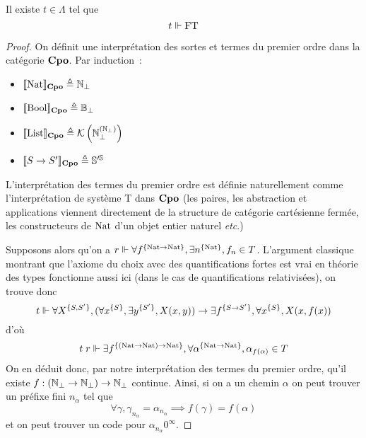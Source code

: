 \documentclass{article}
\begin{document}
\begin{them}[FAN]
  Il existe $t\in \Lambda$ tel que
  \[t\Vdash \mathrm{FT}\]
\end{them}

\begin{proof}
  On définit une interprétation des sortes et termes du premier ordre dans la catégorie $\mathbf{Cpo}$. Par induction~:
  \begin{itemize}
  \item $\llbracket \mathrm{Nat} \rrbracket_{\mathbf{Cpo}} \triangleq \mathbb{N}_\bot$
  \item $\llbracket \mathrm{Bool} \rrbracket_{\mathbf{Cpo}} \triangleq \mathbb{B}_\bot$
  \item $\llbracket \mathrm{List} \rrbracket_{\mathbf{Cpo}} \triangleq \mathcal K\left(\mathbb{N}_\bot^{(\mathbb{N}_\bot)}\right)$
  \item $\llbracket S \to S' \rrbracket_{\mathbf{Cpo}} \triangleq \mathbb{S}'^{\mathbb{S}}$
  \end{itemize}
  L'interprétation des termes du premier ordre est définie naturellement comme l'interprétation de système T dans $\mathbf{Cpo}$ (les paires, les abstraction et applications viennent directement de la structure de catégorie cartésienne fermée, les constructeurs de $\mathrm{Nat}$ d'un objet entier naturel \textit{etc}.)

  Supposons alors qu'on a $r\Vdash \forall f^{\{\mathrm{Nat} \to \mathrm{Nat}\}}, \exists n^{\{\mathrm{Nat}\}}, f_n \in T$. L'argument classique montrant que l'axiome du choix avec des quantifications fortes est vrai en théorie des types fonctionne aussi ici (dans le cas de quantifications relativisées), on trouve donc
  \[t\Vdash \forall X^{\{S,S'\}}, (\forall x^{\{S\}}, \exists y^{\{S'\}}, X(x,y))\to \exists f^{\{S \to S'\}}, \forall x^{\{S\}}, X(x,f(x))\]
  d'où
  \[t\;r\Vdash \exists f^{\{(\mathrm{Nat}\to\mathrm{Nat})\to\mathrm{Nat}\}}, \forall \alpha^{\{\mathrm{Nat}\to\mathrm{Nat}\}}, \alpha_{f(\alpha)}\in T\]
  On en déduit donc, par notre interprétation des termes du premier ordre, qu'il existe $f : (\mathbb{N}_\bot\to\mathbb{N}_\bot)\to\mathbb{N}_\bot$ continue. Ainsi, si on a un chemin $\alpha$ on peut trouver un préfixe fini $n_\alpha$ tel que
  \[\forall \gamma, \gamma_{n_\alpha} = \alpha_{n_\alpha} \implies f(\gamma) = f(\alpha)\]
  et on peut trouver un code pour $\alpha_{n_\alpha} 0^\infty$.
\end{proof}
\end{document}
